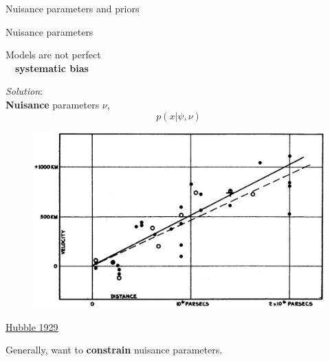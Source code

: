 \documentclass[
aspectratio=169,
14pt,
professionalfonts
]{beamer}
\newcommand{\arrow}{~\ding{220}~}
\begin{document}
\begin{frame}
    \center
    \Large
    Nuisance parameters and priors
    \end{frame}
    
    \begin{frame}{Nuisance parameters}

        \begin{minipage}{0.49\textwidth}
            Models are not perfect \\
            \arrow \textbf{systematic bias}

            \vspace{0.5cm}
            \textit{Solution}: \\
            \textbf{Nuisance} parameters $\nu$,
            $$p(x|\psi, \nu)$$
        \end{minipage}
        \begin{minipage}{0.49\textwidth}
            \begin{figure}
                \centering
                \includegraphics[width=\textwidth]{../plots/hubble.png}
            \end{figure}
            \flushright \small
            \href{https://www.pnas.org/doi/10.1073/pnas.15.3.168}{Hubble 1929}
        \end{minipage}
    \vspace{0.5cm}
    
    Generally, want to \textbf{constrain} nuisance parameters.
    
\end{frame}
    
\end{document}
